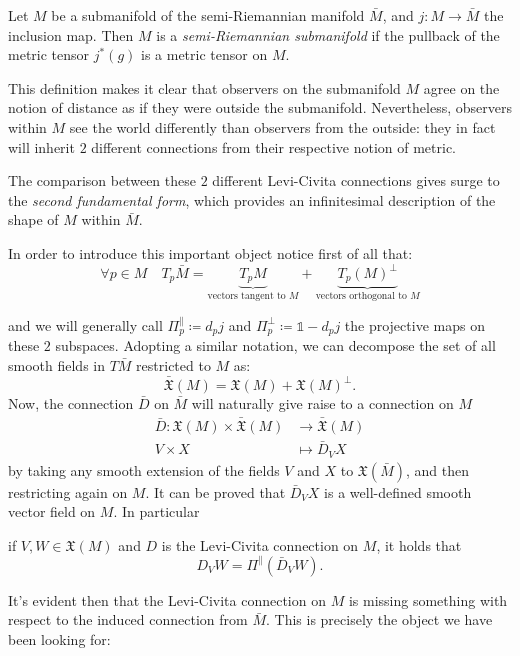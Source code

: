 \begin{definition}
	Let \(M\) be a submanifold of the semi-Riemannian manifold \(\bar{M}\), and \(j:M\rightarrow\bar{M}\) the inclusion map. Then \(M\) is a \emph{semi-Riemannian submanifold} if the pullback of the metric tensor \(j^*(g)\) is a metric tensor on \(M\).
\end{definition}

This definition makes it clear that observers on the submanifold \(M\) agree on the notion of distance as if they were outside the submanifold. Nevertheless, observers within \(M\) see the world differently than observers from the outside: they in fact will inherit \(2\) different connections from their respective notion of metric. 

The comparison between these \(2\) different Levi-Civita connections gives surge to the \emph{second fundamental form}, which provides an infinitesimal description of the shape of \(M\) within \(\bar{M}\).

In order to introduce this important object notice first of all that:
\[
\forall p \in M \quad T_p\bar{M} = \underbrace{T_pM}_{\text{vectors tangent to }M}+ \underbrace{T_p(M)^{\perp}}_{\text{vectors orthogonal to } M}
\]

\noindent and we will generally call \(\Pi_p^{\parallel}\coloneqq d_pj\) and \(\Pi_p^{\perp}\coloneqq \mathbb{1} - d_pj\) the projective maps on these \(2\) subspaces.
Adopting a similar notation, we can decompose the set of all smooth fields in \(T\bar{M}\) restricted to \(M\) as:
\[
\bar{\mathfrak{X}}(M) = \mathfrak{X}(M) + \mathfrak{X}(M)^{\perp}.
\]
Now, the connection \(\bar{D}\) on \(\bar{M}\) will naturally give raise to a connection on \(M\)
\begin{align*}
\bar{D} : \mathfrak{X}(M) \times \bar{\mathfrak{X}}(M) & \rightarrow \bar{\mathfrak{X}}(M) \\
	 V \times X &\mapsto \bar{D}_V X
\end{align*}
by taking any smooth extension of the fields \(V\) and \(X\) to \(\mathfrak{X}(\bar{M})\), and then restricting again on \(M\). It can be proved that \(\bar{D}_V X\) is a well-defined smooth vector field on \(M\). In particular
\begin{lemma} 
	if \(V, W \in \mathfrak{X}(M)\) and \(D\) is the Levi-Civita connection on \(M\), it holds that
	\[
	D_V W = \Pi^{\parallel}\left(\bar{D}_V W\right).
	\]
\end{lemma}
It's evident then that the Levi-Civita connection on \(M\) is missing something with respect to the induced connection from \(\bar{M}\). This is precisely the object we have been looking for:

